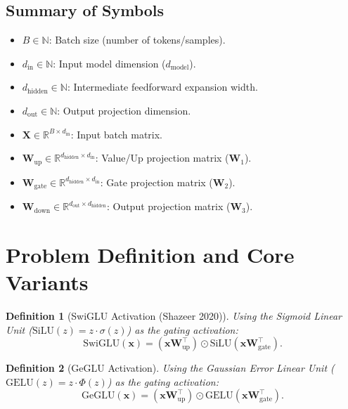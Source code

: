 \documentclass[11pt]{article}
\newtheorem{definition}{Definition}
\begin{document}
\subsection{Summary of Symbols}
\begin{itemize}
    \item $B \in \mathbb{N}$: Batch size (number of tokens/samples).
    \item $d_{\text{in}} \in \mathbb{N}$: Input model dimension ($d_{\text{model}}$).
    \item $d_{\text{hidden}} \in \mathbb{N}$: Intermediate feedforward expansion width.
    \item $d_{\text{out}} \in \mathbb{N}$: Output projection dimension.
    \item $\mathbf{X} \in \mathbb{R}^{B \times d_{\text{in}}}$: Input batch matrix.
    \item $\mathbf{W}_{\text{up}} \in \mathbb{R}^{d_{\text{hidden}} \times d_{\text{in}}}$: Value/Up projection matrix ($\mathbf{W}_1$).
    \item $\mathbf{W}_{\text{gate}} \in \mathbb{R}^{d_{\text{hidden}} \times d_{\text{in}}}$: Gate projection matrix ($\mathbf{W}_2$).
    \item $\mathbf{W}_{\text{down}} \in \mathbb{R}^{d_{\text{out}} \times d_{\text{hidden}}}$: Output projection matrix ($\mathbf{W}_3$).
\end{itemize}

\section{Problem Definition and Core Variants}
\label{sec:problem_definition}

\begin{definition}[SwiGLU Activation (Shazeer 2020)]
Using the Sigmoid Linear Unit ($\text{SiLU}(z) = z \cdot \sigma(z)$) as the gating activation:
\begin{equation}
\label{eq:swiglu}
\text{SwiGLU}(\mathbf{x}) = (\mathbf{x} \mathbf{W}_{\text{up}}^\top) \odot \text{SiLU}(\mathbf{x} \mathbf{W}_{\text{gate}}^\top).
\end{equation}
\end{definition}

\begin{definition}[GeGLU Activation]
Using the Gaussian Error Linear Unit ($\text{GELU}(z) = z \cdot \Phi(z)$) as the gating activation:
\begin{equation}
\label{eq:geglu}
\text{GeGLU}(\mathbf{x}) = (\mathbf{x} \mathbf{W}_{\text{up}}^\top) \odot \text{GELU}(\mathbf{x} \mathbf{W}_{\text{gate}}^\top).
\end{equation}
\end{definition}
\end{document}
